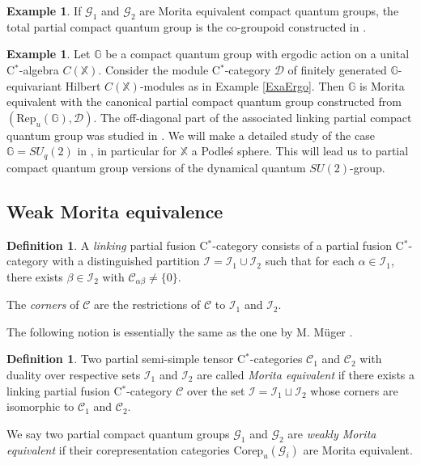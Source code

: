 \documentclass[10pt]{article}
\newcommand{\Corep}{\mathrm{Corep}}
\newcommand{\G}{\mathbb{G}}
\newcommand{\X}{\mathbb{X}}
\newcommand{\CatC}{\mathcal{C}}
\newcommand{\CatD}{\mathcal{D}}
\newcommand{\CatCC}{\mathscr{C}}
\newcommand{\Rep}{\mathrm{Rep}}
\theoremstyle{definition}
\newtheorem{Def}[Theorem]{Definition}
\newtheorem{Exa}[Theorem]{Example}
\numberwithin{equation}{section}
\begin{document}
\begin{Exa} If $\mathscr{G}_1$ and $\mathscr{G}_2$ are Morita equivalent compact quantum groups, the total partial compact quantum group is the co-groupoid constructed in \cite{Bic1}. 
\end{Exa}

\begin{Exa}  Let $\G$ be a compact quantum group with ergodic action on a unital C$^*$-algebra $C(\mathbb{X})$. Consider the module C$^*$-category $\CatD$ of finitely generated $\G$-equivariant Hilbert $C(\mathbb{X})$-modules as in Example \ref{ExaErgo}. Then $\G$ is Morita equivalent with the canonical partial compact quantum group constructed from $(\Rep_u(\G),\CatD)$. The off-diagonal part of the associated linking partial compact quantum group was studied in \cite{DCY1}. We will make a detailed study of the case $\G = SU_q(2)$ in \cite{DCT2}, in particular for $\X$ a Podle\'{s} sphere. This will lead us to partial compact quantum group versions of the dynamical quantum $SU(2)$-group.
\end{Exa}


\subsection{Weak Morita equivalence}

\begin{Def} A \emph{linking} partial fusion C$^*$-category consists of a partial fusion C$^*$-category with a distinguished partition $\mathscr{I} =\mathscr{I}_1 \cup \mathscr{I}_2$ such that for each $\alpha\in \mathscr{I}_1$, there exists $\beta \in \mathscr{I}_{2}$ with $\CatC_{\alpha\beta}\neq \{0\}$.

The \emph{corners} of $\CatCC$ are the restrictions of $\CatCC$ to $\mathscr{I}_1$ and $\mathscr{I}_2$.
\end{Def}

The following notion is essentially the same as the one by M. M\"{u}ger \cite{Mug1}. 

\begin{Def} Two partial semi-simple tensor C$^*$-categories $\CatCC_1$ and $\CatCC_2$ with duality over respective sets $\mathscr{I}_1$ and $\mathscr{I}_2$ are called \emph{Morita equivalent} if there exists a linking partial fusion C$^*$-category $\CatCC$ over the set $\mathscr{I}=\mathscr{I}_1\sqcup \mathscr{I}_2$ whose corners are isomorphic to $\CatCC_1$ and $\CatCC_2$.

We say two partial compact quantum groups $\mathscr{G}_1$ and $\mathscr{G}_2$ are \emph{weakly Morita equivalent} if their corepresentation categories $\Corep_u(\mathscr{G}_i)$ are Morita equivalent. 
\end{Def} 
\end{document}
